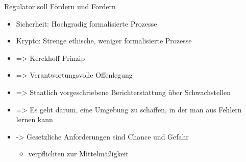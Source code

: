 \begin{frame}{Regulator soll Fördern und Fordern}
  \begin{itemize}
    \item  Sicherheit: Hochgradig formalisierte Prozesse
    \item  Krypto: Strenge ethische, weniger formalisierte Prozesse 
    \item  => Kerckhoff Prinzip
    \item  => Verantwortungsvolle Offenlegung
    \item  => Staatlich vorgeschriebene Berichterstattung über Schwachstellen
    \item  => Es geht darum, eine Umgebung zu schaffen, in der man aus Fehlern lernen kann
    \item -> Gesetzliche Anforderungen sind Chance und Gefahr
    \begin{itemize}
      \item verpflichten zur Mittelmäßigkeit
    \end{itemize}
  \end{itemize}
\end{frame}
